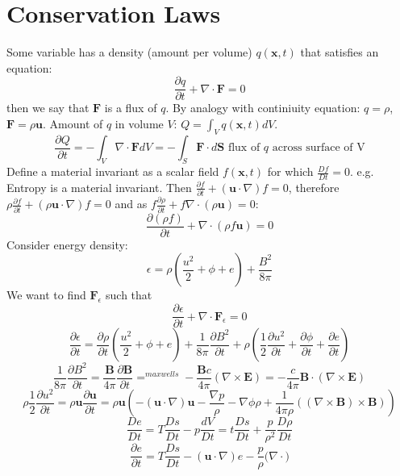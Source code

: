 \documentclass{article}
\begin{document}
\section{Conservation Laws}
Some variable has a density (amount per volume) $q(\bm x, t)$ that satisfies an equation:
$$
\frac{\partial q}{\partial t} + \nabla \cdot \bm F = 0
$$
then we say that $\bm F$ is a flux of $q$. By analogy with continiuity equation: $q = \rho$, $\bm F = \rho \bm u$. Amount of $q$ in volume $V$: $Q = \int_V q(\bm x,t) dV$.
$$
\frac{\partial Q}{\partial t} = - \int_V \nabla \cdot \bm F  dV = - \int_S \bm F \cdot d \bm S \text{ flux of $q$ across surface of V}
$$
Define a material invariant as a scalar field $f(\bm x, t)$ for which $\frac{D f}{Dt} = 0$. e.g. Entropy is a material invariant. Then $\frac{\partial f}{\partial t} + (\bm u \cdot \nabla)f = 0$, therefore $\rho\frac{\partial f}{\partial t} + (\rho\bm u \cdot \nabla)f = 0$ and as $f\frac{\partial \rho}{\partial t} + f\nabla \cdot (\rho \bm u) =0$:
$$
\frac{\partial (\rho f)}{\partial t} + \nabla \cdot ( \rho f \bm u) = 0
$$
Consider energy density:
$$
\epsilon = \rho(\frac{u^2}{2} + \phi + e) + \frac{B^2}{8\pi}
$$
We want to find $\bm F_{\epsilon}$ such that $$\frac{\partial \epsilon}{\partial t} + \nabla \cdot \bm F_{\epsilon} = 0$$
$$
\frac{\partial \epsilon}{\partial t} = \frac{\partial \rho}{\partial t} ( \frac{u^2}{2} + \phi + e) + \frac{1}{8\pi} \frac{\partial B^2}{\partial t} + \rho (\frac{1}{2} \frac{\partial u^2}{\partial t} + \frac{\partial \phi}{\partial t} + \frac{\partial e}{\partial t})
$$
$$
\frac{1}{8 \pi } \frac{\partial B^2}{\partial t} = \frac{\bm B}{4 \pi} \frac{\partial \bm B}{\partial t} =^{maxwells} - \frac{\bm B c}{4 \pi} (\nabla \times \bm E) = - \frac{c}{4\pi} \bm B \cdot (\nabla \times \bm E)
$$
$$
\rho \frac{1}{2} \frac{\partial u^2}{\partial t} = \rho \bm u \frac{\partial \bm u}{\partial t} = \rho \bm u ( - (\bm u \cdot \nabla) \bm u - \frac{\nabla p}{\rho} - \nabla \phi \rho + \frac{1}{4\pi \rho}((\nabla \times \bm B) \times \bm B)) 
$$
$$
\frac{De}{Dt} =T \frac{Ds}{Dt} - p\frac{dV}{Dt} = t\frac{Ds}{Dt} + \frac{p}{\rho^2}\frac{D\rho}{Dt}
$$
$$
\frac{\partial e}{\partial t}  = T \frac{Ds}{Dt} -(\bm u \cdot \nabla) e - \frac{p}{\rho}(\nabla \cdot \bm)
$$
\end{document}
